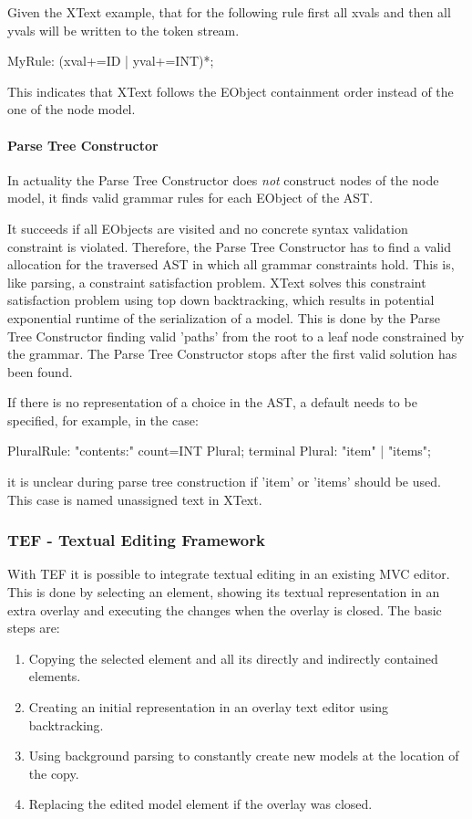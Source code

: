 Given the XText example, that for the following rule first all xvals and then all yvals will be written to the token stream.
\begin{xtxt}
MyRule: (xval+=ID | yval+=INT)*; 
\end{xtxt}
This indicates that XText follows the EObject containment order instead of the one of the node model.

\paragraph{Parse Tree Constructor}  \label{xtxt:ptc}
In actuality the Parse Tree Constructor does \emph{not} construct nodes of the node model, it finds valid grammar rules for each EObject of the AST. 

It succeeds if all EObjects are visited and no concrete syntax validation constraint is violated. Therefore, the Parse Tree Constructor has to find a valid allocation for the traversed AST in which all grammar constraints hold.  This is, like parsing, a constraint satisfaction problem. XText solves this constraint satisfaction problem using top down backtracking, which results in potential exponential runtime of the serialization of a model. This is done by the Parse Tree Constructor finding valid 'paths' from the root to a leaf node constrained by the grammar. The Parse Tree Constructor stops after the first valid solution has been found. 

If there is no representation of a choice in the AST, a default needs to be specified, for example, in the case: 
\begin{xtxt}
PluralRule: "contents:" count=INT Plural;
terminal Plural: "item" | "items";
\end{xtxt}
it is unclear during parse tree construction if 'item' or 'items' should be used. This case is named unassigned text in XText.



\subsubsection{TEF - Textual Editing Framework}
With TEF it is possible to integrate textual editing in an existing MVC editor. This is done by selecting an element, showing its textual representation in an extra overlay and executing the changes when the overlay is closed. 
The basic steps are:
\begin{enumerate}
	\item Copying the selected element and all its directly and indirectly contained elements.
	\item Creating an initial representation in an overlay text editor using backtracking.
	\item Using background parsing to constantly create new models at the location of the copy.
	\item Replacing the edited model element if the overlay was closed.
\end{enumerate}

